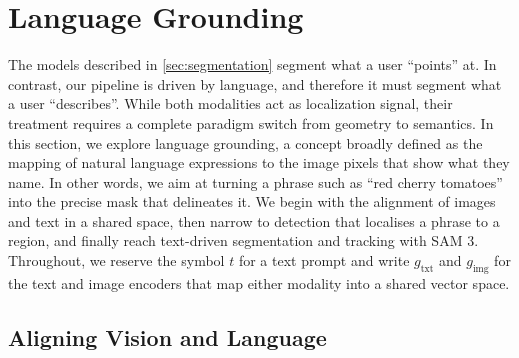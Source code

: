 \section{Language Grounding}
\label{sec:language-grounding}

The models described in \cref{sec:segmentation} segment what a user ``points'' at. In contrast,
our pipeline is driven by language, and therefore it must segment what a user ``describes''. While both modalities act as localization signal, their treatment requires a complete paradigm switch from geometry to semantics. In this section, we explore language grounding, a concept broadly defined as the mapping of natural language expressions to the image pixels that show what they name. In other words, we aim at turning a phrase such as ``red cherry tomatoes'' into the precise mask that delineates it. We begin with the alignment of images and text in a shared space, then narrow to detection that localises a phrase to a region, and finally  reach text-driven segmentation and tracking with SAM 3. Throughout, we reserve the symbol $t$ for a text prompt and write $g_\text{txt}$ and $g_\text{img}$ for the text and image encoders that map either modality into a shared vector space.

\subsection{Aligning Vision and Language}
\label{subsec:multimodality}

